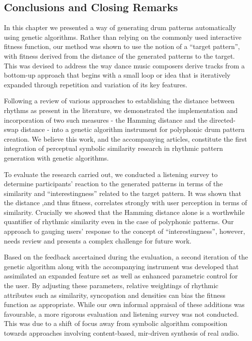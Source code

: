 {{\subsection{Conclusions and Closing Remarks}

In this chapter we presented a way of generating drum patterns automatically using genetic algorithms. Rather than relying on the commonly used interactive fitness function, our method was shown to use the notion of a “target pattern”, with fitness derived from the distance of the generated patterns to the target. This was devised to address the way dance music composers derive tracks from a bottom-up approach that begins with a small loop or idea that is iteratively expanded through repetition and variation of its key features.

Following a review of various approaches to establishing the distance between rhythms as present in the literature, we demonstrated the implementation and incorporation of two such measures - the Hamming distance and the directed-swap distance - into a genetic algorithm instrument for polyphonic drum pattern creation. We believe this work, and the accompanying articles, constitute the first integration of perceptual symbolic similarity research in rhythmic pattern generation with genetic algorithms.

To evaluate the research carried out, we conducted a listening survey to determine participants' reaction to the generated patterns in terms of the similarity and “interestingness” related to the target pattern. It was shown that the distance ,and thus fitness, correlates strongly with user perception in terms of similarity. Crucially we showed that the Hamming distance alone is a worthwhile quantifier of rhythmic similarity even in the case of polyphonic patterns. Our approach to gauging users' response to the concept of  “interestingness”, however, needs review and presents a complex challenge for future work. 

Based on the feedback ascertained during the evaluation, a second iteration of the genetic algorithm along with the accompanying instrument was developed that assimilated an expanded feature set as well as enhanced parametric control for the user. By adjusting these parameters, relative weightings of rhythmic attributes such as similarity, syncopation and densities can bias the fitness function as appropriate. While our own informal appraisal of these additions was favourable, a more rigorous evaluation and listening survey was not conducted. This was due to a shift of focus away from symbolic algorithm composition towards approaches involving content-based, \acrshort{mir}-driven synthesis of real audio.

}}
